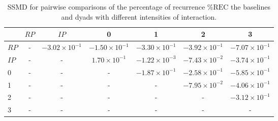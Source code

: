 \begin{table}
\centering
\caption{SSMD for pairwise comparisons of the percentage of recurrence $\%\text{REC}$ the baselines and dyads with different intensities of interaction.}
\label{tab:ssmd_rec}
\begin{tabular}{lcccccc}
\toprule
 & $RP$ & $IP$ & 0 & 1 & 2 & 3 \\
\midrule
$RP$ & - & $-3.02 \times 10^{-1}$ & $-1.50 \times 10^{-1}$ & $-3.30 \times 10^{-1}$ & $-3.92 \times 10^{-1}$ & $-7.07 \times 10^{-1}$ \\
$IP$ & - & - & $1.70 \times 10^{-1}$ & $-1.22 \times 10^{-3}$ & $-7.43 \times 10^{-2}$ & $-3.74 \times 10^{-1}$ \\
0 & - & - & - & $-1.87 \times 10^{-1}$ & $-2.58 \times 10^{-1}$ & $-5.85 \times 10^{-1}$ \\
1 & - & - & - & - & $-7.95 \times 10^{-2}$ & $-4.06 \times 10^{-1}$ \\
2 & - & - & - & - & - & $-3.12 \times 10^{-1}$ \\
3 & - & - & - & - & - & - \\
\bottomrule
\end{tabular}
\end{table}
